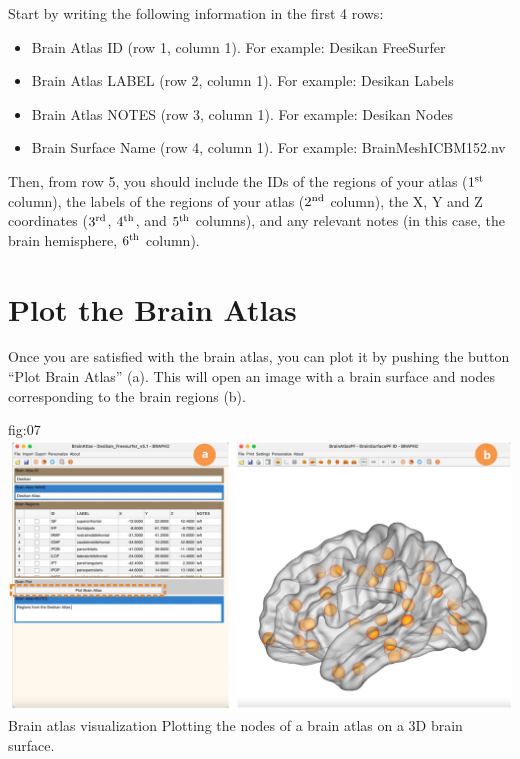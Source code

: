 \documentclass[justified]{tufte-handout}
\begin{document}

Start by writing the following information in the first 4 rows:
\begin{itemize}

\item Brain Atlas ID (row 1, column 1). 
For example: Desikan FreeSurfer

\item Brain Atlas LABEL (row 2, column 1). 
For example: Desikan Labels

\item Brain Atlas NOTES (row 3, column 1).
For example: Desikan Nodes

\item Brain Surface Name (row 4, column 1).
For example: BrainMeshICBM152.nv

\end{itemize}
Then, from row 5, you should include the IDs of the regions of your atlas ($1^{\rm st}$ column), the labels of the regions of your atlas ($2^{\rm nd}$ column), the X, Y and Z coordinates ($3^{\rm rd}$, $4^{\rm th}$, and $5^{\rm th}$ columns), and any relevant notes (in this case, the brain hemisphere, $6^{\rm th}$ column).	

\clearpage
\section{Plot the Brain Atlas}

Once you are satisfied with the brain atlas, you can plot it by pushing the button ``Plot Brain Atlas'' (a). 
This will open an image with a brain surface and nodes corresponding to the brain regions (b).

	{fig:07}
	{\includegraphics{fig07.jpg}}
	{Brain atlas visualization}
	{
	Plotting the nodes of a brain atlas on a 3D brain surface. 
	}
	
\end{document}
